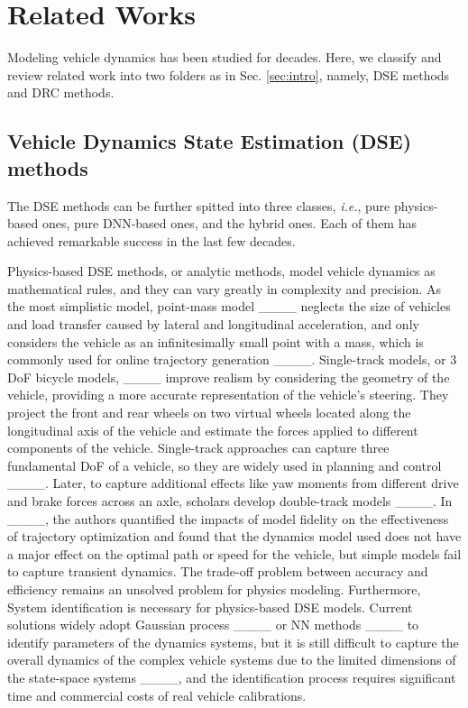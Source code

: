 \section{Related Works}
\label{sec:review}

Modeling vehicle dynamics has been studied for decades. Here, we classify and review related work into two folders as in Sec. \ref{sec:intro}, namely, DSE methods and DRC methods.

\subsection{Vehicle Dynamics State Estimation (DSE) methods}

The DSE methods can be further spitted into three classes, \textit{i.e.}, pure physics-based ones, pure DNN-based ones, and the hybrid ones. Each of them has achieved remarkable success in the last few decades. 

Physics-based DSE methods, or analytic methods, model vehicle dynamics as mathematical rules, and they can vary greatly in complexity and precision. 
As the most simplistic model, point-mass model ____ neglects the size of vehicles and load transfer caused by lateral and longitudinal acceleration, and only considers the vehicle as an infinitesimally small point with a mass, which is commonly used for online trajectory generation ____. 
Single-track models, or 3 DoF bicycle models, ____ improve realism by considering the geometry of the vehicle, providing a more accurate representation of the vehicle’s steering. They project the front and rear wheels on two virtual wheels located along the longitudinal axis of the vehicle and estimate the forces applied to different components of the vehicle. Single-track approaches can capture three fundamental DoF of a vehicle, so they are widely used in planning and control ____. Later, to capture additional effects like yaw moments from different drive and brake forces across an axle, scholars develop double-track models ____. 
In ____, the authors quantified the impacts of model fidelity on the effectiveness of trajectory optimization and found that the dynamics model used does not have a major effect on the optimal path or speed for the vehicle, but simple models fail to capture transient dynamics.
The trade-off problem between accuracy and efficiency remains an unsolved problem for physics modeling.
Furthermore, System identification is necessary for physics-based DSE models.
Current solutions widely adopt Gaussian process ____ or NN methods ____ to identify parameters of the dynamics systems, but it is still difficult to capture the overall dynamics of the complex vehicle systems due to the limited dimensions of the state-space systems ____, and the identification process requires significant time and commercial costs of real vehicle calibrations. 

